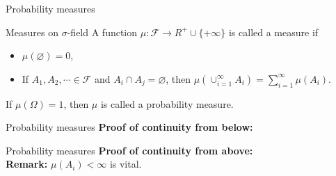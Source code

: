 \documentclass [aspectratio=169]{beamer}
\newcommand{\mc}{\mathcal}
\begin{document}
\begin{frame}{Probability measures}
    \begin{block}{Measures on $\sigma$-field}
    A function $\mu: \mc{F} \to R^{+}\cup \{+\infty\}$ is called a measure if
    \begin{itemize}
        \item $\mu(\varnothing) = 0$,
        \item If $A_1, A_2, \cdots \in \mc{F}$ and $A_i \cap A_j = \varnothing$, then $\mu(\cup_{i = 1}^\infty A_i) = \sum_{i = 1}^\infty \mu(A_i)$.
    \end{itemize}
    If $\mu(\Omega) = 1$, then $\mu$ is called a probability measure. 
    \end{block}
    \vspace{0.1in}
\end{frame}

\begin{frame}{Probability measures}
    \textbf{Proof of continuity from below:}
\vspace{2.5in}
\end{frame}

\begin{frame}{Probability measures}
    \textbf{Proof of continuity from above:}
\vspace{1.5in}\\
\textbf{Remark:} $\mu(A_i) < \infty$ is vital. %
\vspace{1in}
\end{frame}
\end{document}
